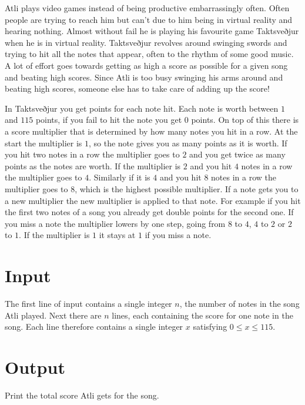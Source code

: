 
Atli plays video games instead of being productive embarrassingly often.
Often people are trying to reach him but can't due to him being in virtual reality and hearing nothing.
Almost without fail he is playing his favourite game Taktsveðjur when he is in virtual reality.
Taktsveðjur revolves around swinging swords and trying to hit all the notes that appear,
often to the rhythm of some good music.
A lot of effort goes towards getting as high a score as possible for a given song and beating high scores.
Since Atli is too busy swinging his arms around and beating high scores,
someone else has to take care of adding up the score!

In Taktsveðjur you get points for each note hit.
Each note is worth between $1$ and $115$ points, if you fail to hit the note you get $0$ points.
On top of this there is a score multiplier that is determined by how many notes you hit in a row.
At the start the multiplier is $1$, so the note gives you as many points as it is worth.
If you hit two notes in a row the multiplier goes to $2$ and you get twice as many points as the notes are worth.
If the multiplier is $2$ and you hit $4$ notes in a row the multiplier goes to $4$.
Similarly if it is $4$ and you hit $8$ notes in a row the multiplier goes to $8$,
which is the highest possible multiplier.
If a note gets you to a new multiplier the new multiplier is applied to that note.
For example if you hit the first two notes of a song you already get double points for the second one.
If you miss a note the multiplier lowers by one step,
going from $8$ to $4$, $4$ to $2$ or $2$ to $1$.
If the multiplier is $1$ it stays at $1$ if you miss a note.

\section*{Input}
The first line of input contains a single integer $n$, the number of notes in the song Atli played.
Next there are $n$ lines, each containing the score for one note in the song.
Each line therefore contains a single integer $x$ satisfying $0 \leq x \leq 115$.

\section*{Output}
Print the total score Atli gets for the song.

